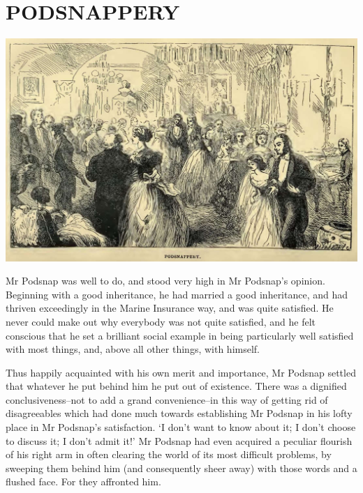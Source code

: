 
\chapter{PODSNAPPERY}

\includegraphics[scale=2.3]{01-11-01}

Mr Podsnap was well to do, and stood very high in Mr Podsnap’s opinion.
Beginning with a good inheritance, he had married a good inheritance,
and had thriven exceedingly in the Marine Insurance way, and was
quite satisfied. He never could make out why everybody was not quite
satisfied, and he felt conscious that he set a brilliant social example
in being particularly well satisfied with most things, and, above all
other things, with himself.

Thus happily acquainted with his own merit and importance, Mr Podsnap
settled that whatever he put behind him he put out of existence. There
was a dignified conclusiveness--not to add a grand convenience--in
this way of getting rid of disagreeables which had done much towards
establishing Mr Podsnap in his lofty place in Mr Podsnap’s satisfaction.
‘I don’t want to know about it; I don’t choose to discuss it; I don’t
admit it!’ Mr Podsnap had even acquired a peculiar flourish of his
right arm in often clearing the world of its most difficult problems, by
sweeping them behind him (and consequently sheer away) with those words
and a flushed face. For they affronted him.

